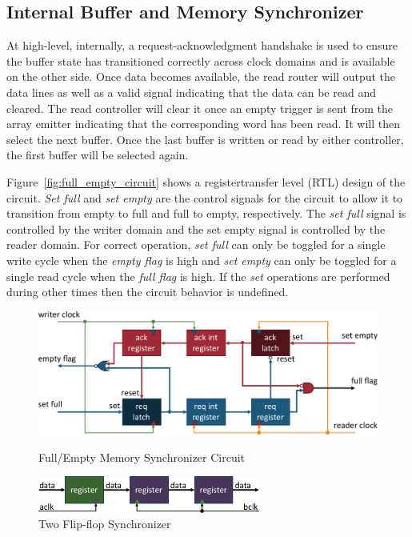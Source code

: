     \subsection{Internal Buffer and Memory Synchronizer}
        \label{Sec:MemorySync}
        At high-level, internally, a request-acknowledgment handshake is used to ensure the buffer state has transitioned correctly across clock domains and is available on the other side. Once data becomes available, the read router will output the data lines as well as a valid signal indicating that the data can be read and cleared. The read controller will clear it once an empty trigger is sent from the array emitter indicating that the corresponding word has been read. It will then select the next buffer. Once the last buffer is written or read by either controller, the first buffer will be selected again.

        Figure~\ref{fig:full_empty_circuit} shows a register\-transfer level (RTL) design of the circuit. {\it Set full} and {\it set empty} are the control signals for the circuit to allow it to transition from empty to full and full to empty, respectively. The {\it set full} signal is controlled by the writer domain and the {set empty} signal is controlled by the reader domain. For correct operation, {\it set full} can only be toggled for a single write cycle when the {\it empty flag} is high and {\it set empty} can only be toggled for a single read cycle when the {\it full flag} is high. If the {\it set} operations are performed during other times then the circuit behavior is undefined.

        \begin{figure}[t]
            \centering
            \includegraphics[width=1.0\textwidth]{fig/full_empty_circuit.pdf}
            \caption{Full/Empty Memory Synchronizer Circuit}
            \label{fig:full_empty_circuit}

            \centering
            \includegraphics[width=0.65\textwidth]{fig/two_flip_flop_synchronizer.pdf}
            \caption{Two Flip-flop Synchronizer}
            \label{fig:two_flip_flop_synchronizer}
        \end{figure}


